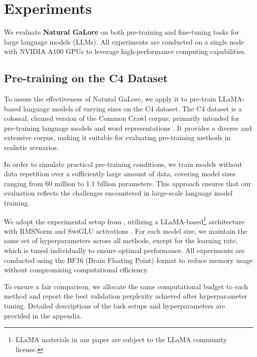\section{Experiments}

We evaluate \textbf{Natural GaLore} on both pre-training and fine-tuning tasks for large language models (LLMs). All experiments are conducted on a single node with NVIDIA A100 GPUs to leverage high-performance computing capabilities.

\subsection{Pre-training on the C4 Dataset}

To assess the effectiveness of Natural GaLore, we apply it to pre-train LLaMA-based language models of varying sizes on the C4 dataset. The C4 dataset is a colossal, cleaned version of the Common Crawl corpus, primarily intended for pre-training language models and word representations \citep{raffelExploringLimitsTransfer2023}. It provides a diverse and extensive corpus, making it suitable for evaluating pre-training methods in realistic scenarios.

In order to simulate practical pre-training conditions, we train models without data repetition over a sufficiently large amount of data, covering model sizes ranging from 60 million to 1.1 billion parameters. This approach ensures that our evaluation reflects the challenges encountered in large-scale language model training.

We adopt the experimental setup from \citet{lialinReLoRAHighRankTraining2023}, utilizing a LLaMA-based\footnote[3]{LLaMA materials in our paper are subject to the LLaMA community license.} architecture with RMSNorm and SwiGLU activations \citep{zhangRootMeanSquare2019,shazeerGLUVariantsImprove2020,touvronLlamaOpenFoundation2023}. For each model size, we maintain the same set of hyperparameters across all methods, except for the learning rate, which is tuned individually to ensure optimal performance. All experiments are conducted using the BF16 (Brain Floating Point) format to reduce memory usage without compromising computational efficiency.

To ensure a fair comparison, we allocate the same computational budget to each method and report the best validation perplexity achieved after hyperparameter tuning. Detailed descriptions of the task setups and hyperparameters are provided in the appendix.



